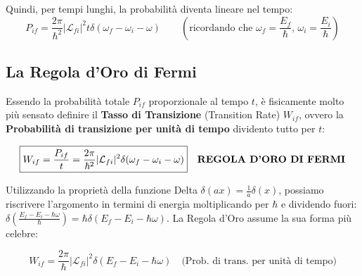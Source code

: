 \documentclass[11pt, a4paper]{article}
\begin{document}
Quindi, per tempi lunghi, la probabilità diventa lineare nel tempo: %
\begin{equation*}
    P_{if} = \frac{2\pi}{\hbar^2} |\mathcal{L}_{fi}|^2 t \delta(\omega_f - \omega_i - \omega) \qquad \left(\text{ricordando che } \omega_f = \frac{E_f}{\hbar} , \, \omega_i = \frac{E_i}{\hbar}\right) %
\end{equation*}

\subsection{La Regola d'Oro di Fermi} %

Essendo la probabilità totale $P_{if}$ proporzionale al tempo $t$, è fisicamente molto più sensato definire il \textbf{Tasso di Transizione} (Transition Rate) $W_{if}$, ovvero la \textbf{Probabilità di transizione per unità di tempo} dividento tutto per $t$: %

\begin{equation}
    \boxed{ W_{if} = \frac{P_{if}}{t} = \frac{2\pi}{\hbar^2} |\mathcal{L}_{fi}|^2 \delta(\omega_f - \omega_i - \omega) } \quad \text{\textbf{REGOLA D'ORO DI FERMI}} %
\end{equation}

\noindent
Utilizzando la proprietà della funzione Delta $\delta(ax) = \frac{1}{a}\delta(x)$, possiamo riscrivere l'argomento in termini di energia moltiplicando per $\hbar$ e dividendo fuori: $\delta\left(\frac{E_f - E_i - \hbar\omega}{\hbar}\right) = \hbar \delta(E_f - E_i - \hbar\omega)$. La Regola d'Oro assume la sua forma più celebre: %

\begin{equation}
    \boxed{ W_{if} = \frac{2\pi}{\hbar} |\mathcal{L}_{fi}|^2 \delta(E_f - E_i - \hbar\omega) } \quad \text{(Prob. di trans. per unità di tempo)} %
\end{equation}
\end{document}
